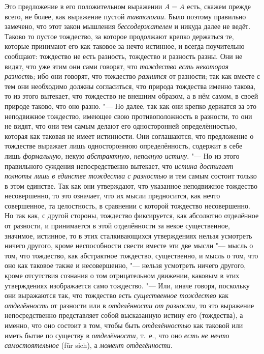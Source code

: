 Это предложение в его положительном выражении $A=A$ есть,
скажем прежде всего, не более, как выражение пустой
{\em тавтологии}. Было поэтому правильно замечено, что
этот закон мышления {\em бессодержателен} и никуда
далее не ведёт. Таково то пустое тождество, за которое продолжают крепко
держаться те, которые принимают его как таковое за нечто истинное, и
всегда поучительно сообщают: тождество не есть разность, тождество и
разность разны. Они не видят, что уже этим они сами говорят, что
{\em тождество есть некоторая разность;} ибо они
говорят, что тождество {\em разнится} от разности; так
как вместе с тем они необходимо должны согласиться, что природа тождества
именно такова, то из этого вытекает, что тождество не внешним образом, а в
нём самом, в своей природе таково, что оно разно. "--- Но далее, так как они
крепко держатся за это неподвижное тождество, имеющее свою
противоположность в разности, то они не видят, что они тем самым делают его
односторонней определённостью, которая как таковая не имеет истинности.
Они соглашаются, что предложение о тождестве выражает лишь одностороннюю
определённость, содержит в себе лишь {\em формальную,}
некую {\em абстрактную,}
{\em неполную истину}. "--- Но из этого правильного
суждения непосредственно вытекает, что {\em истина
достигает полноты лишь в единстве тождества с разностью} и тем самым
состоит только в этом единстве. Так как они утверждают, что указанное
неподвижное тождество несовершенно, то это означает, что их мысли
предносится, как нечто совершенное, та целостность, в сравнении с которой
тождество несовершенно. Но так как, с другой стороны, тождество
фиксируется, как абсолютно отделённое от разности, и принимается в этой
отделённости за некое существенное, значимое, истинное, то в этих
сталкивающихся утверждениях нельзя усмотреть ничего другого, кроме
неспособности свести вместе эти две мысли "--- мысль о том, что тождество, как
абстрактное тождество, существенно, и мысль о том, что оно как таковое
также и несовершенно, "--- нельзя усмотреть ничего другого, кроме отсутствия
сознания о том отрицательном движении, каковым в этих утверждениях
изображается само тождество. "--- Или, иначе говоря, поскольку они выражаются
так, что тождество есть {\em существенное тождество}
как {\em отделённость} от разности или в
{\em отделённости от разности,} то это выражение
непосредственно представляет собой высказанную истину его (тождества), а
именно, что оно состоит в том, чтобы быть
{\em отделённостью} как таковой или иметь бытие по
существу в {\em отделённости,} т.~е., что оно
{\em есть не нечто самостоятельное} (für sich), а
{\em момент отделённости}.


